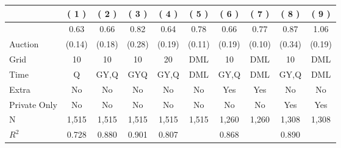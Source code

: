 
\begin{tabular}{lccccccccc}
\toprule
 & ( 1 ) & ( 2 ) & ( 3 ) & ( 4 ) & ( 5 ) & ( 6 ) & ( 7 ) & ( 8 ) & ( 9 )\\
\midrule
 & 0.63 & 0.66 & 0.82 & 0.64 & 0.78 & 0.66 & 0.77 & 0.87 & 1.06\\

\multirow{-2}{*}{\raggedright\arraybackslash Auction} & (0.14) & (0.18) & (0.28) & (0.19) & (0.11) & (0.19) & (0.10) & (0.34) & (0.19)\\

\midrule
Grid & 10 & 10 & 10 & 20 & DML & 10 & DML & 10 & DML\\

Time & Q & GY,Q & GYQ & GY,Q & DML & GY,Q & DML & GY,Q & DML\\

Extra & No & No & No & No & No & Yes & Yes & No & No\\

Private Only & No & No & No & No & No & No & No & Yes & Yes\\

N & 1,515 & 1,515 & 1,515 & 1,515 & 1,515 & 1,260 & 1,260 & 1,308 & 1,308\\

$R^2$ & 0.728 & 0.880 & 0.901 & 0.807 &  & 0.868 &  & 0.890 & \\
\bottomrule
\end{tabular}
